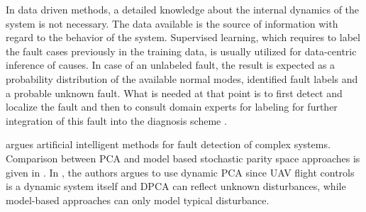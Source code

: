 In data driven methods, a detailed knowledge about the internal dynamics 
of the system is not necessary. The data available is the source of information 
with regard to the behavior of the system. Supervised learning, which requires 
to label the fault cases previously in the training data, is usually utilized for 
data-centric inference of causes. In case of an unlabeled fault, the result is 
expected as a probability distribution of the available normal modes, identified 
fault labels and a probable unknown fault. What is needed at that point is to 
first detect and localize the fault and then to consult domain experts for labeling 
for further integration of this fault into the diagnosis scheme \cite{dataCentricDiagOffline}.

\cite{gui2002fault} argues artificial intelligent methods for fault detection of complex 
systems. Comparison between PCA and model based stochastic parity space 
approaches is given in \cite{hagenblad2004comparison}.
In \cite{li2016data}, the authors argues to use dynamic PCA since UAV flight 
controls is a dynamic system itself and DPCA can reflect unknown disturbances, 
while model-based approaches can only model typical disturbance.  